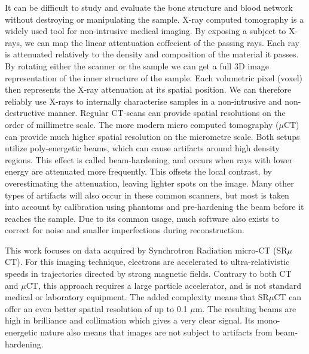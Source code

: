 It can be difficult to study and evaluate the bone structure and blood network without destroying or
manipulating the sample. X-ray computed tomography is a widely used tool for non-intrusive medical
imaging. By exposing a subject to X-rays, we can map the linear attentuation coffecient of the passing
rays. Each ray is attenuated relatively to the density and composition of the material it passes. By
rotating either the scanner or the sample we can get a full 3D image representation of the inner
structure of the sample. Each volumetric pixel (voxel) then represents the X-ray attenuation at its spatial position. We can therefore reliably use X-rays to internally characterise samples in a non-intrusive and non-destructive manner.
Regular CT-scans can provide spatial resolutions on the order of millimetre scale. The more modern micro computed tomography ($\mu$CT) can provide much higher spatial resolution on the micrometre scale. Both setups utilize poly-energetic beams, which can cause artifacts around high density regions. This effect is called beam-hardening, and occurs when rays with lower energy are attenuated more frequently. This offsets the local contrast, by overestimating the attenuation, leaving lighter spots on the image. Many other types of artifacts will also occur in these common scanners, but most is taken into account by calibration using phantoms and pre-hardening the beam before it reaches the sample. Due to its common usage, much software also exists to correct for noise and smaller imperfections during reconstruction.

This work focuses on data acquired by Synchrotron Radiation micro-CT (SR$\mu$CT). For this imaging
technique, electrons are accelerated to ultra-relativistic speeds in trajectories directed by strong
magnetic fields. Contrary to both CT and $\mu$CT, this approach requires a large particle accelerator, and is not standard medical or laboratory equipment. The added complexity means that SR$\mu$CT can offer an even better spatial resolution of up to 0.1 $\mu$m. The resulting beams are high in brilliance and collimation which gives a very clear signal. Its mono-energetic nature also means that images are not subject to artifacts from beam-hardening.



